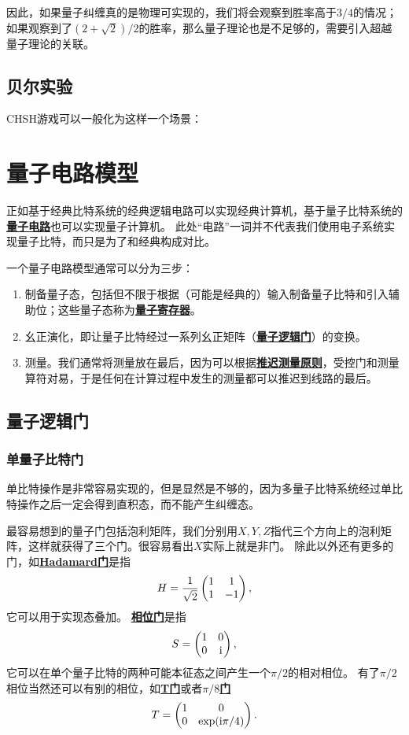 \documentclass[hyperref, UTF8, a4paper]{ctexart}
\newcommand*{\ii}{\mathrm{i}}
\newcommand*{\concept}[1]{\underline{\textbf{#1}}}
\begin{document}
因此，如果量子纠缠真的是物理可实现的，我们将会观察到胜率高于$3/4$的情况；如果观察到了$(2+\sqrt{2})/2$的胜率，那么量子理论也是不足够的，需要引入超越量子理论的关联。

\subsection{贝尔实验}

CHSH游戏可以一般化为这样一个场景：

\section{量子电路模型}

正如基于经典比特系统的经典逻辑电路可以实现经典计算机，基于量子比特系统的\concept{量子电路}也可以实现量子计算机。
此处“电路”一词并不代表我们使用电子系统实现量子比特，而只是为了和经典构成对比。

一个量子电路模型通常可以分为三步：
\begin{enumerate}
    \item 制备量子态，包括但不限于根据（可能是经典的）输入制备量子比特和引入辅助位；这些量子态称为\concept{量子寄存器}。
    \item 幺正演化，即让量子比特经过一系列幺正矩阵（\concept{量子逻辑门}）的变换。
    \item 测量。我们通常将测量放在最后，因为可以根据\concept{推迟测量原则}，受控门和测量算符对易，于是任何在计算过程中发生的测量都可以推迟到线路的最后。
\end{enumerate}

\subsection{量子逻辑门}

\subsubsection{单量子比特门}

单比特操作是非常容易实现的，但是显然是不够的，因为多量子比特系统经过单比特操作之后一定会得到直积态，而不能产生纠缠态。

最容易想到的量子门包括泡利矩阵，我们分别用$X, Y, Z$指代三个方向上的泡利矩阵，这样就获得了三个门。很容易看出$X$实际上就是非门。
除此以外还有更多的门，如\concept{Hadamard门}是指
\begin{equation}
    H = \frac{1}{\sqrt{2}} \pmqty{1 & 1 \\ 1 & -1},
\end{equation}
它可以用于实现态叠加。
\concept{相位门}是指
\begin{equation}
    S = \pmqty{1 & 0 \\ 0 & \ii},
\end{equation}
它可以在单个量子比特的两种可能本征态之间产生一个$\pi/2$的相对相位。
有了$\pi/2$相位当然还可以有别的相位，如\concept{T门}或者\concept{$\pi/8$门}
\begin{equation}
    T = \pmqty{1 & 0 \\ 0 & \exp(\ii \pi / 4)}.
\end{equation}
\end{document}
